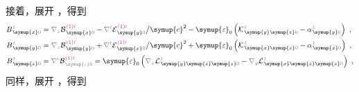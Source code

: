 接着，展开 ，得到
\begin{subequations} \label{eq:B_0}
\begin{align}
	B^{\;\!\mathcolor{gray}{t}}_{\;\! \symup{x}\mathcolor{gray}{0}} &= \mathcolor{gray}{\nabla_z} 
	{\mathcal{B}}^{\;\!\textcolor{Maroon}{(1)}\mathcolor{gray}{t}}_{\;\! \symup{x} \mathcolor{gray}{0}} - \mathcolor{gray}{\nabla^t} 
	{\mathcal{E}}^{\;\!\textcolor{Maroon}{(1)}\mathcolor{gray}{t}}_{\;\! \symup{y} \mathcolor{gray}{0}} \big/ {\symup{c}}^2 - {\symup{\varepsilon}}_0 \left( 
	{\mathcal{K}}^{\;\!\mathcolor{gray}{t}}_{\;\! \symup{y}\symup{z}\mathcolor{gray}{0}} - 
	{\alpha}^{\;\!\mathcolor{gray}{t}}_{\;\! \symup{y}\mathcolor{gray}{0}} \right)~, \label{eq:B_x0} \\
	B^{\;\!\mathcolor{gray}{t}}_{\;\! \symup{y}\mathcolor{gray}{0}} &= \mathcolor{gray}{\nabla_z} 
	{\mathcal{B}}^{\;\!\textcolor{Maroon}{(1)}\mathcolor{gray}{t}}_{\;\! \symup{y} \mathcolor{gray}{0}} + \mathcolor{gray}{\nabla^t} 
	{\mathcal{E}}^{\;\!\textcolor{Maroon}{(1)}\mathcolor{gray}{t}}_{\;\! \symup{x} \mathcolor{gray}{0}} \big/ {\symup{c}}^2 + {\symup{\varepsilon}}_0 \left( 
	{\mathcal{K}}^{\;\!\mathcolor{gray}{t}}_{\;\! \symup{x}\symup{z}\mathcolor{gray}{0}} - 
	{\alpha}^{\;\!\mathcolor{gray}{t}}_{\;\! \symup{x}\mathcolor{gray}{0}} \right)~, \label{eq:B_y0} \\
	B^{\;\!\mathcolor{gray}{t}}_{\;\! \symup{z} \mathcolor{gray}{0}} &= \mathcolor{gray}{\nabla^\iota} 
	{\mathcal{B}}^{\;\!\textcolor{Maroon}{(1)}\mathcolor{gray}{t}}_{\;\! \mathcolor{gray}{\symup{\iota}} \mathcolor{gray}{0}} = {\symup{\varepsilon}}_0 \left( \mathcolor{gray}{\nabla_x} {\mathcal{L}}^{\;\!\mathcolor{gray}{t}}_{\;\! \symup{y}\symup{z}\symup{z}\mathcolor{gray}{0}} - \mathcolor{gray}{\nabla_y}
	{\mathcal{L}}^{\;\!\mathcolor{gray}{t}}_{\;\! \symup{x}\symup{z}\symup{z}\mathcolor{gray}{0}} \right)~, \label{eq:B_z0}
\end{align}
\end{subequations}
同样，展开 ，得到
